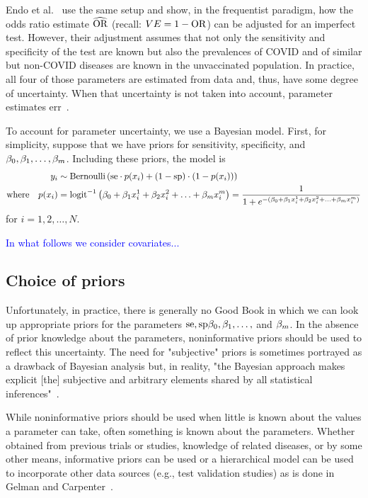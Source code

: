 \documentclass[11pt,notitlepage,twoside]{article}
\newcommand{\ej}[1]{\textcolor{blue}{#1}}
\begin{document}
Endo et al.~\cite{endo2020bias} use the same setup and show, in the frequentist paradigm, how the odds ratio estimate $\widehat{\text{OR}}$ (recall: $VE = 1 - \text{OR}$) can be adjusted for an imperfect test. However, their adjustment assumes that not only the sensitivity and specificity of the test are known but also the prevalences of COVID and of similar but non-COVID diseases are known in the unvaccinated population. In practice, all four of those parameters are estimated from data and, thus, have some degree of uncertainty. When that uncertainty is not taken into account, parameter estimates err~\cite{larremore2020jointly,endo2020bias,gelman2020bayesian}. 

To account for parameter uncertainty, we use a Bayesian model. First, for simplicity, suppose that we have priors for sensitivity, specificity, and $\beta_0, \beta_1, \ldots, \beta_m$. Including these priors, the model is
\begin{align}
y_i &\sim \text{Bernoulli}\left(\text{se} \cdot p(x_i) + (1 - \text{sp}) \cdot (1 - p(x_i)) \right)
\\
\text{where} \quad p(x_i) &= \text{logit}^{-1}\left( \beta_0 + \beta_1 x^1_i + \beta_2 x^2_i + \ldots + \beta_m x^m_i \right) = \frac{1}{1 + e^{-(\beta_0 + \beta_1 x^1_i + \beta_2 x^2_i + \ldots + \beta_m x^m_i)}}
\end{align}
for $i=1,2,\ldots,N$.

\ej{In what follows we consider covariates...}

\subsection{Choice of priors} 

Unfortunately, in practice, there is generally no Good Book in which we can look up appropriate priors for the parameters $\text{se}, \text{sp} \beta_0, \beta_1, \ldots,$ and $\beta_m$. In the absence of prior knowledge about the parameters, noninformative priors should be used to reflect this uncertainty. The need for "subjective" priors is sometimes portrayed as a drawback of Bayesian analysis but, in reality, "the Bayesian approach makes explicit [the] subjective and arbitrary elements shared by all statistical inferences"~\cite{greenland2006bayesian}.

While noninformative priors should be used when little is known about the values a parameter can take, often something is known about the parameters. Whether obtained from previous trials or studies, knowledge of related diseases, or by some other means, informative priors can be used or a hierarchical model can be used to incorporate other data sources (e.g., test validation studies) as is done in Gelman and Carpenter~\cite{gelman2020bayesian}.
\end{document}
